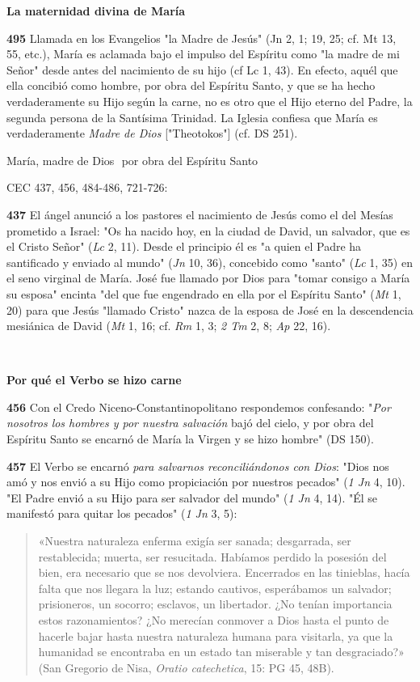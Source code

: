 \documentclass[]{article}
\begin{document}
\textbf{La maternidad divina de María}

\textbf{495} Llamada en los Evangelios "la Madre de Jesús" (Jn 2, 1; 19,
25; cf. Mt 13, 55, etc.), María es aclamada bajo el impulso del Espíritu
como "la madre de mi Señor" desde antes del nacimiento de su hijo (cf Lc
1, 43). En efecto, aquél que ella concibió como hombre, por obra del
Espíritu Santo, y que se ha hecho verdaderamente su Hijo según la carne,
no es otro que el Hijo eterno del Padre, la segunda persona de la
Santísima Trinidad. La Iglesia confiesa que María es verdaderamente
\emph{Madre de Dios} {[}"Theotokos"{]} (cf. DS 251).

María, madre de Dios  por obra del Espíritu Santo

CEC 437, 456, 484-486, 721-726:

\textbf{437} El ángel anunció a los pastores el nacimiento de Jesús como
el del Mesías prometido a Israel: "Os ha nacido hoy, en la ciudad de
David, un salvador, que es el Cristo Señor" (\emph{Lc} 2, 11). Desde el
principio él es "a quien el Padre ha santificado y enviado al mundo"
(\emph{Jn} 10, 36), concebido como "santo" (\emph{Lc} 1, 35) en el seno
virginal de María. José fue llamado por Dios para "tomar consigo a María
su esposa" encinta "del que fue engendrado en ella por el Espíritu
Santo" (\emph{Mt} 1, 20) para que Jesús "llamado Cristo" nazca de la
esposa de José en la descendencia mesiánica de David (\emph{Mt} 1, 16;
cf. \emph{Rm} 1, 3; \emph{2 Tm} 2, 8; \emph{Ap} 22, 16).

\textbf{\\
}

\textbf{Por qué el Verbo se hizo carne}

\textbf{456} Con el Credo Niceno-Constantinopolitano respondemos
confesando: "\emph{Por nosotros los hombres y por nuestra salvación}
bajó del cielo, y por obra del Espíritu Santo se encarnó de María la
Virgen y se hizo hombre" (DS 150).

\textbf{457} El Verbo se encarnó \emph{para salvarnos reconciliándonos
con Dios}: "Dios nos amó y nos envió a su Hijo como propiciación por
nuestros pecados" (\emph{1 Jn} 4, 10). "El Padre envió a su Hijo para
ser salvador del mundo" (\emph{1 Jn} 4, 14). "Él se manifestó para
quitar los pecados" (\emph{1 Jn} 3, 5):

\begin{quote}
«Nuestra naturaleza enferma exigía ser sanada; desgarrada, ser
restablecida; muerta, ser resucitada. Habíamos perdido la posesión del
bien, era necesario que se nos devolviera. Encerrados en las tinieblas,
hacía falta que nos llegara la luz; estando cautivos, esperábamos un
salvador; prisioneros, un socorro; esclavos, un libertador. ¿No tenían
importancia estos razonamientos? ¿No merecían conmover a Dios hasta el
punto de hacerle bajar hasta nuestra naturaleza humana para visitarla,
ya que la humanidad se encontraba en un estado tan miserable y tan
desgraciado?» (San Gregorio de Nisa, \emph{Oratio catechetica}, 15: PG
45, 48B).
\end{quote}
\end{document}
